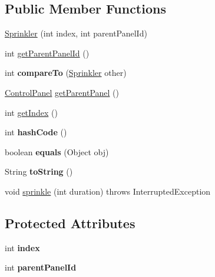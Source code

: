 \subsection*{Public Member Functions}
\begin{DoxyCompactItemize}
\item 
\hyperlink{classmodel_1_1Sprinkler_a126e004e4a7c7be7fa8078c43c77f3f8}{Sprinkler} (int index, int parent\-Panel\-Id)
\item 
int \hyperlink{classmodel_1_1Sprinkler_a24be7eddcf009e4df169e517725127b0}{get\-Parent\-Panel\-Id} ()
\item 
\hypertarget{classmodel_1_1Sprinkler_a413d9983c176f558de511cdae6cc37fb}{int {\bfseries compare\-To} (\hyperlink{classmodel_1_1Sprinkler}{Sprinkler} other)}\label{classmodel_1_1Sprinkler_a413d9983c176f558de511cdae6cc37fb}

\item 
\hyperlink{classmodel_1_1ControlPanel}{Control\-Panel} \hyperlink{classmodel_1_1Sprinkler_ac320304804baa03236250fba2b69197e}{get\-Parent\-Panel} ()
\item 
int \hyperlink{classmodel_1_1Sprinkler_ade1cefff6568e5cbcbbc161235b09d48}{get\-Index} ()
\item 
\hypertarget{classmodel_1_1Sprinkler_a0ed997740b4eba223f93347f2ff02fcf}{int {\bfseries hash\-Code} ()}\label{classmodel_1_1Sprinkler_a0ed997740b4eba223f93347f2ff02fcf}

\item 
\hypertarget{classmodel_1_1Sprinkler_a67629afe3a483e949d969ca29925f049}{boolean {\bfseries equals} (Object obj)}\label{classmodel_1_1Sprinkler_a67629afe3a483e949d969ca29925f049}

\item 
\hypertarget{classmodel_1_1Sprinkler_ad2ada5afb708c8bc737dc36443ff211c}{String {\bfseries to\-String} ()}\label{classmodel_1_1Sprinkler_ad2ada5afb708c8bc737dc36443ff211c}

\item 
void \hyperlink{classmodel_1_1Sprinkler_a44e84feac9ce8ae56f907bb51839bb17}{sprinkle} (int duration)  throws Interrupted\-Exception 
\end{DoxyCompactItemize}
\subsection*{Protected Attributes}
\begin{DoxyCompactItemize}
\item 
\hypertarget{classmodel_1_1Sprinkler_af610d7ff078c5ca794c7246057f629e8}{int {\bfseries index}}\label{classmodel_1_1Sprinkler_af610d7ff078c5ca794c7246057f629e8}

\item 
\hypertarget{classmodel_1_1Sprinkler_abfbc961422b8949e8031ee6eb18da54d}{int {\bfseries parent\-Panel\-Id}}\label{classmodel_1_1Sprinkler_abfbc961422b8949e8031ee6eb18da54d}

\end{DoxyCompactItemize}


